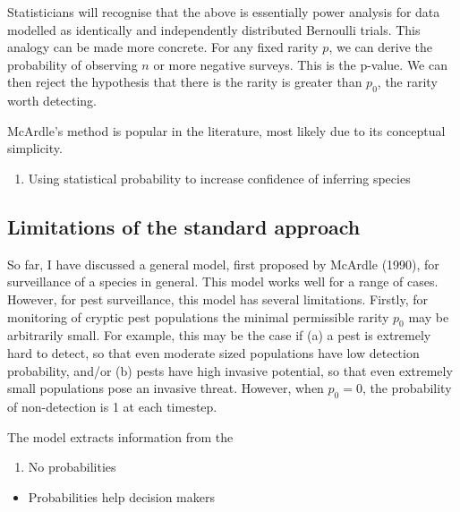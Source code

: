 \documentclass[
]{book}
\providecommand{\tightlist}{%
  \setlength{\itemsep}{0pt}\setlength{\parskip}{0pt}}
\begin{document}
Statisticians will recognise that the above is essentially power analysis for data modelled as identically and independently distributed Bernoulli trials. This analogy can be made more concrete. For any fixed rarity \(p\), we can derive the probability of observing \(n\) or more negative surveys. This is the p-value. We can then reject the hypothesis that there is the rarity is greater than \(p_0\), the rarity worth detecting.

McArdle's method is popular in the literature, most likely due to its conceptual simplicity.

\begin{enumerate}
\def\labelenumi{\arabic{enumi}.}
\setcounter{enumi}{1995}
\tightlist
\item
  Using statistical probability to increase confidence of inferring species
\end{enumerate}

\hypertarget{limitations-of-the-standard-approach}{%
\subsection{Limitations of the standard approach}\label{limitations-of-the-standard-approach}}

So far, I have discussed a general model, first proposed by McArdle (1990), for surveillance of a species in general. This model works well for a range of cases. However, for pest surveillance, this model has several limitations. Firstly, for monitoring of cryptic pest populations the minimal permissible rarity \(p_0\) may be arbitrarily small. For example, this may be the case if (a) a pest is extremely hard to detect, so that even moderate sized populations have low detection probability, and/or (b) pests have high invasive potential, so that even extremely small populations pose an invasive threat. However, when \(p_0 = 0\), the probability of non-detection is 1 at each timestep.

The model extracts information from the

\begin{enumerate}
\def\labelenumi{\arabic{enumi}.}
\tightlist
\item
  No probabilities
\end{enumerate}

\begin{itemize}
\tightlist
\item
  Probabilities help decision makers
\end{itemize}
\end{document}
